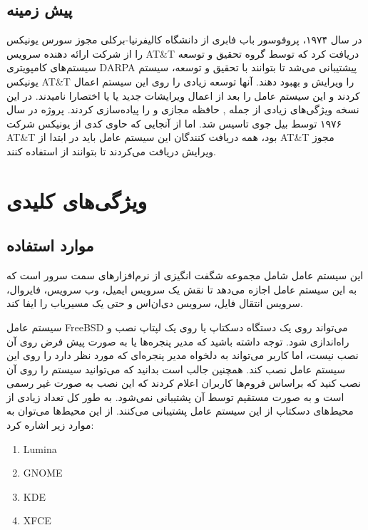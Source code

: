 \documentclass[20pt, a4paper]{article}
\begin{document}
\subsection{پیش زمینه}

در سال ۱۹۷۴، پروفوسور باب فابری از دانشگاه کالیفرنیا-برکلی مجوز سورس یونیکس را
از شرکت ارائه دهنده سرویس AT\&T دریافت کرد که توسط گروه تحقیق و توسعه سیستم‌های
کامپویتری DARPA پیشتیبانی می‌شد تا بتوانند با تحقیق و توسعه، سیستم یونیکس AT\&T
را ویرایش و بهبود دهند. آنها توسعه زیادی را روی این سیستم اعمال کردند و این
سیستم عامل را بعد از اعمال ویرایشات جدید  یا  یا اختصارا  نامیدند.  در این نسخه ویژگی‌های
زیادی از جمله , حافظه مجازی و  را
پیاده‌سازی کردند. پروژه  در سال ۱۹۷۶ توسط بیل جوی تاسیس شد. اما از
آنجایی که  حاوی کدی از یونیکس شرکت AT\&T بود، همه دریافت کنندگان این
سیستم عامل باید در ابتدا از AT\&T مجوز ویرایش دریافت می‌کردند تا بتوانند از
 استفاده کنند.

\section{ویژگی‌های کلیدی}

\subsection{موارد استفاده}

این سیستم عامل شامل مجموعه شگفت انگیزی از نرم‌افزار‌های سمت سرور است که به این
سیستم عامل اجازه می‌دهد تا نقش یک سرویس ایمیل، وب سرویس، فایروال، سرویس انتقال
فایل، سرویس دی‌ان‌اس و حتی یک مسیریاب را ایفا کند.

سیستم عامل FreeBSD می‌تواند روی یک دستگاه دسکتاپ یا روی یک لپتاپ نصب و
راه‌اندازی شود.  توجه داشته باشید که مدیر پنجره‌ها یا  به
صورت پیش فرض روی آن نصب نیست، اما کاربر می‌تواند به دلخواه مدیر پنجره‌ای که مورد
نظر دارد را روی این سیستم عامل نصب کند. همچنین جالب است بدانید که می‌توانید
سیستم  را روی آن نصب کنید که براساس فروم‌ها کاربران اعلام کردند که
این نصب به صورت غیر رسمی است و به صورت مستقیم توسط آن پشتیبانی نمی‌شود.  به طور
کل تعداد زیادی از محیط‌های دسکتاپ از این سیستم عامل پشتیبانی می‌کنند. از این
محیط‌ها می‌توان به موارد زیر اشاره کرد:

\begin{enumerate}
    \item Lumina
    \item GNOME
    \item KDE
    \item XFCE
\end{enumerate}
\end{document}
